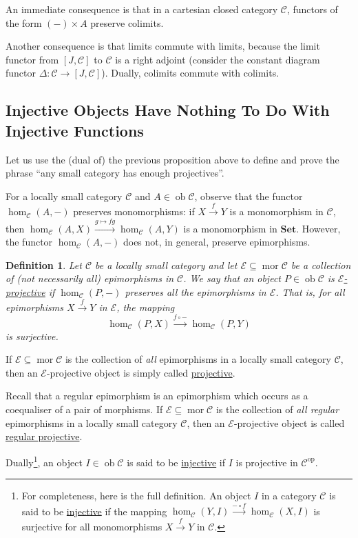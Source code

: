 \documentclass[a4paper,11pt]{article}
\theoremstyle{break_italics}
\newtheorem*{definition*}{Definition}
\theoremstyle{break_upright}
\theoremstyle{remark}
\newcommand{\ob}{\operatorname{ob}}
\newcommand{\mor}{\operatorname{mor}}
\newcommand{\C}{\mathcal{C}}
\newcommand{\Set}{\mathbf{Set}}
\newcommand{\op}{\mathrm{op}}
\begin{document}
An immediate consequence is that in a cartesian closed category $\C$, functors of the form $(-) \times A$ preserve colimits.

Another consequence is that limits commute with limits, because the limit functor from $[J,\C]$ to $\C$ is a right adjoint (consider the constant diagram functor $\Delta \colon \C \to [J,\C]$). Dually, colimits commute with colimits.








\subsection{Injective Objects Have Nothing To Do With Injective Functions}

Let us use the (dual of) the previous proposition above to define and prove the phrase ``any small category has enough projectives''.

For a locally small category $\C$ and $A \in \ob\C$, observe that the functor $\hom_\C(A, -)$ preserves monomorphisms: if $X \xrightarrow{f} Y$ is a monomorphism in $\C$, then $\hom_\C(A,X) \xrightarrow{g \mapsto fg} \hom_\C(A,Y)$ is a monomorphism in $\Set$. However, the functor $\hom_\C(A, -)$ does not, in general, preserve epimorphisms.

\begin{definition*}
Let $\C$ be a locally small category and let $\mathcal E \subseteq \mor\C$ be a collection of (not necessarily all) epimorphisms in $\C$. We say that an object $P \in \ob\C$ is \uline{$\mathcal E$-projective} if $\hom_\C(P, -)$ preserves all the epimorphisms in $\mathcal E$. That is, for all epimorphisms $X \xrightarrow{f} Y$ in $\mathcal E$, the mapping
\[
	\hom_\C(P, X) \xrightarrow{f \circ -} \hom_\C(P, Y)
\]
is surjective.
\end{definition*}

If $\mathcal E \subseteq \mor \C$ is the collection of \textit{all} epimorphisms in a locally small category $\C$, then an $\mathcal E$-projective object is simply called \uline{projective}. 

Recall that a regular epimorphism is an epimorphism which occurs as a coequaliser of a pair of morphisms. If $\mathcal E \subseteq \mor\C$ is the collection of \textit{all regular} epimorphisms in a locally small category $\C$, then an $\mathcal E$-projective object is called \uline{regular projective}. 

Dually\footnote{For completeness, here is the full definition. An object $I$ in a category $\C$ is said to be \uline{injective} if the mapping $\hom_\C(Y, I) \xrightarrow{- \circ f} \hom_\C(X,I)$ is surjective for all monomorphisms $X \xrightarrow{f} Y$ in $\C$.}, an object $I \in \ob\C$ is said to be \uline{injective} if $I$ is projective in $\C^\op$.
\end{document}
